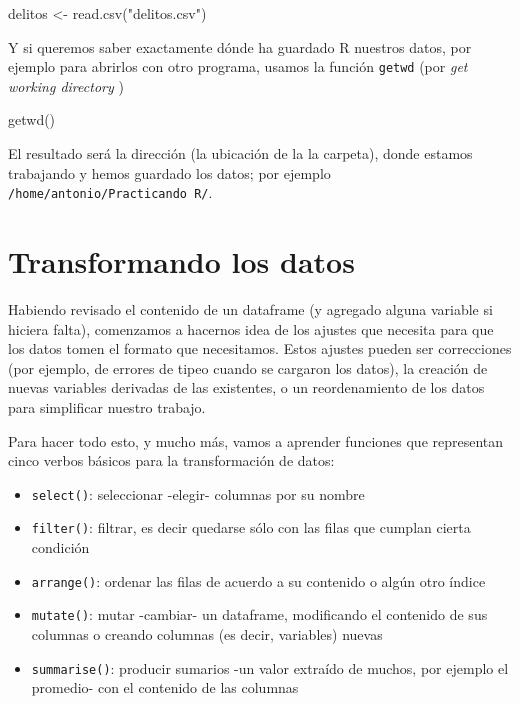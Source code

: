\documentclass[
]{book}
\newenvironment{Shaded}{\begin{snugshade}}{\end{snugshade}}
\newcommand{\FunctionTok}[1]{\textcolor[rgb]{0.00,0.00,0.00}{#1}}
\newcommand{\NormalTok}[1]{#1}
\newcommand{\OtherTok}[1]{\textcolor[rgb]{0.56,0.35,0.01}{#1}}
\newcommand{\StringTok}[1]{\textcolor[rgb]{0.31,0.60,0.02}{#1}}
\providecommand{\tightlist}{%
  \setlength{\itemsep}{0pt}\setlength{\parskip}{0pt}}
\begin{document}
\begin{Shaded}
\begin{Highlighting}[]
\NormalTok{delitos }\OtherTok{\textless{}{-}} \FunctionTok{read.csv}\NormalTok{(}\StringTok{"delitos.csv"}\NormalTok{)}
\end{Highlighting}
\end{Shaded}

Y si queremos saber exactamente dónde ha guardado R nuestros datos, por ejemplo para abrirlos con otro programa, usamos la función \texttt{getwd} (por \emph{get working directory} )

\begin{Shaded}
\begin{Highlighting}[]
\FunctionTok{getwd}\NormalTok{()}
\end{Highlighting}
\end{Shaded}

El resultado será la dirección (la ubicación de la la carpeta), donde estamos trabajando y hemos guardado los datos; por ejemplo \texttt{/home/antonio/Practicando\ R/}.

\hypertarget{transformando-los-datos}{%
\section{Transformando los datos}\label{transformando-los-datos}}

Habiendo revisado el contenido de un dataframe (y agregado alguna variable si hiciera falta), comenzamos a hacernos idea de los ajustes que necesita para que los datos tomen el formato que necesitamos. Estos ajustes pueden ser correcciones (por ejemplo, de errores de tipeo cuando se cargaron los datos), la creación de nuevas variables derivadas de las existentes, o un reordenamiento de los datos para simplificar nuestro trabajo.

Para hacer todo esto, y mucho más, vamos a aprender funciones que representan cinco verbos básicos para la transformación de datos:

\begin{itemize}
\tightlist
\item
  \texttt{select()}: seleccionar -elegir- columnas por su nombre
\item
  \texttt{filter()}: filtrar, es decir quedarse sólo con las filas que cumplan cierta condición
\item
  \texttt{arrange()}: ordenar las filas de acuerdo a su contenido o algún otro índice
\item
  \texttt{mutate()}: mutar -cambiar- un dataframe, modificando el contenido de sus columnas o creando columnas (es decir, variables) nuevas
\item
  \texttt{summarise()}: producir sumarios -un valor extraído de muchos, por ejemplo el promedio- con el contenido de las columnas
\end{itemize}
\end{document}
